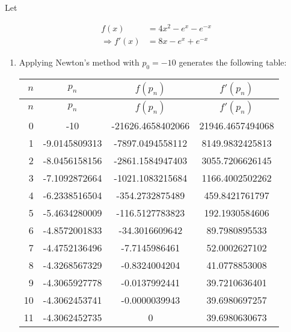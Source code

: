 \documentclass[../../../../Assignments]{subfiles}
\begin{document}
\begin{solution}
    Let

    \begin{align*}
                     f(x) &= 4x^2 - e^x - e^{-x} \\
        \Rightarrow f'(x) &= 8x - e^x + e^{-x}
    \end{align*}

    \begin{enumerate}[label = \alph*)]
        \item Applying Newton's method with \(p_0 = -10\) generates the
            following table:

            \begin{longtable}{r S[table-format=-2.10] S[table-format=-5.10] S[table-format=5.10]}
                \toprule
                \(n\)  &     {\(p_n\)}    &     {\(f(p_n)\)}    &    {\(f'(p_n)\)}   \\
                \midrule
                \endfirsthead
                \(n\)  &     {\(p_n\)}    &     {\(f(p_n)\)}    &    {\(f'(p_n)\)}   \\
                \midrule
                  &  -10             &  -21626.4658402066  &  21946.4657494068  \\
                    1  &   -9.0145809313  &   -7897.0494558112  &   8149.9832425813  \\
                    2  &   -8.0456158156  &   -2861.1584947403  &   3055.7206626145  \\
                    3  &   -7.1092872664  &   -1021.1083215684  &   1166.4002502262  \\
                    4  &   -6.2338516504  &    -354.2732875489  &    459.8421761797  \\
                    5  &   -5.4634280009  &    -116.5127783823  &    192.1930584606  \\
                    6  &   -4.8572001833  &     -34.3016609642  &     89.7980895533  \\
                    7  &   -4.4752136496  &      -7.7145986461  &     52.0002627102  \\
                    8  &   -4.3268567329  &      -0.8324004204  &     41.0778853008  \\
                    9  &   -4.3065927778  &      -0.0137992441  &     39.7210636401  \\
                   10  &   -4.3062453741  &      -0.0000039943  &     39.6980697257  \\
                   11  &   -4.3062452735  &       0             &     39.6980630673  \\
                \bottomrule
            \end{longtable}


\end{enumerate}
\end{solution}
\end{document}
